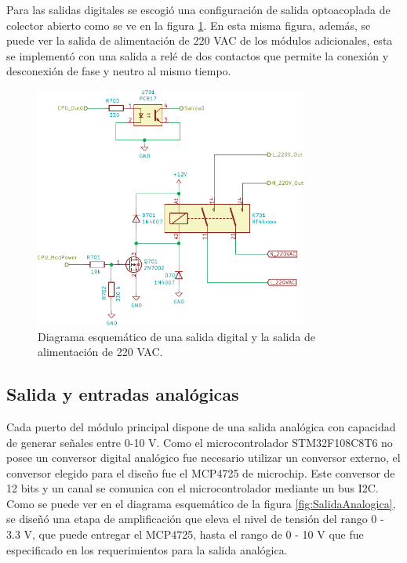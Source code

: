 Para las salidas digitales se escogió una configuración de salida optoacoplada de colector abierto como se ve en la figura \ref{fig:SalidaDigital}. En esta misma figura, además, se puede ver la salida de alimentación de 220 VAC de los módulos adicionales, esta se implementó con una salida a relé de dos contactos que permite la conexión y desconexión de fase y neutro al mismo tiempo.

\begin{figure}[H]
	\centering
	\includegraphics[width=0.8\textwidth]{./Figures/SalidaDigital.pdf}
	\caption{Diagrama esquemático de una salida digital y la salida de alimentación de 220 VAC.}
	\label{fig:SalidaDigital}
\end{figure}

\subsection{Salida y entradas analógicas}

Cada puerto del módulo principal dispone de una salida analógica con capacidad de generar señales entre 0-10 V. Como el microcontrolador STM32F108C8T6 no posee un conversor digital analógico fue necesario utilizar un conversor externo, el conversor elegido para el diseño fue el MCP4725 de microchip. Este conversor de 12 bits y un canal se comunica con el microcontrolador mediante un bus I2C. 
Como se puede ver en el diagrama esquemático de la figura \ref{fig:SalidaAnalogica}, se diseñó una etapa de amplificación que eleva el nivel de tensión del rango 0 - 3.3 V, que puede entregar el MCP4725, hasta el rango de 0 - 10 V que fue especificado en los requerimientos para la salida analógica.

